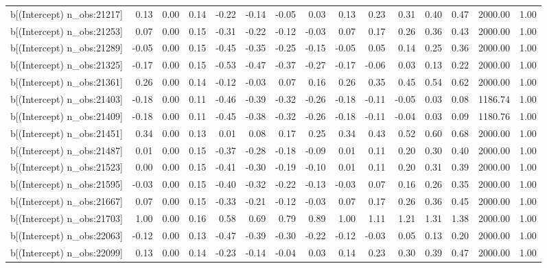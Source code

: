 \begin{table}[ht]
\begin{tabular}{rrrrrrrrrrrrrrr}
  b[(Intercept) n\_obs:21217] & 0.13 & 0.00 & 0.14 & -0.22 & -0.14 & -0.05 & 0.03 & 0.13 & 0.23 & 0.31 & 0.40 & 0.47 & 2000.00 & 1.00 \\ 
  b[(Intercept) n\_obs:21253] & 0.07 & 0.00 & 0.15 & -0.31 & -0.22 & -0.12 & -0.03 & 0.07 & 0.17 & 0.26 & 0.36 & 0.43 & 2000.00 & 1.00 \\ 
  b[(Intercept) n\_obs:21289] & -0.05 & 0.00 & 0.15 & -0.45 & -0.35 & -0.25 & -0.15 & -0.05 & 0.05 & 0.14 & 0.25 & 0.36 & 2000.00 & 1.00 \\ 
  b[(Intercept) n\_obs:21325] & -0.17 & 0.00 & 0.15 & -0.53 & -0.47 & -0.37 & -0.27 & -0.17 & -0.06 & 0.03 & 0.13 & 0.22 & 2000.00 & 1.00 \\ 
  b[(Intercept) n\_obs:21361] & 0.26 & 0.00 & 0.14 & -0.12 & -0.03 & 0.07 & 0.16 & 0.26 & 0.35 & 0.45 & 0.54 & 0.62 & 2000.00 & 1.00 \\ 
  b[(Intercept) n\_obs:21403] & -0.18 & 0.00 & 0.11 & -0.46 & -0.39 & -0.32 & -0.26 & -0.18 & -0.11 & -0.05 & 0.03 & 0.08 & 1186.74 & 1.00 \\ 
  b[(Intercept) n\_obs:21409] & -0.18 & 0.00 & 0.11 & -0.45 & -0.38 & -0.32 & -0.26 & -0.18 & -0.11 & -0.04 & 0.03 & 0.09 & 1180.76 & 1.00 \\ 
  b[(Intercept) n\_obs:21451] & 0.34 & 0.00 & 0.13 & 0.01 & 0.08 & 0.17 & 0.25 & 0.34 & 0.43 & 0.52 & 0.60 & 0.68 & 2000.00 & 1.00 \\ 
  b[(Intercept) n\_obs:21487] & 0.01 & 0.00 & 0.15 & -0.37 & -0.28 & -0.18 & -0.09 & 0.01 & 0.11 & 0.20 & 0.30 & 0.40 & 2000.00 & 1.00 \\ 
  b[(Intercept) n\_obs:21523] & 0.00 & 0.00 & 0.15 & -0.41 & -0.30 & -0.19 & -0.10 & 0.01 & 0.11 & 0.20 & 0.31 & 0.39 & 2000.00 & 1.00 \\ 
  b[(Intercept) n\_obs:21595] & -0.03 & 0.00 & 0.15 & -0.40 & -0.32 & -0.22 & -0.13 & -0.03 & 0.07 & 0.16 & 0.26 & 0.35 & 2000.00 & 1.00 \\ 
  b[(Intercept) n\_obs:21667] & 0.07 & 0.00 & 0.15 & -0.33 & -0.21 & -0.12 & -0.03 & 0.07 & 0.17 & 0.26 & 0.36 & 0.45 & 2000.00 & 1.00 \\ 
  b[(Intercept) n\_obs:21703] & 1.00 & 0.00 & 0.16 & 0.58 & 0.69 & 0.79 & 0.89 & 1.00 & 1.11 & 1.21 & 1.31 & 1.38 & 2000.00 & 1.00 \\ 
  b[(Intercept) n\_obs:22063] & -0.12 & 0.00 & 0.13 & -0.47 & -0.39 & -0.30 & -0.22 & -0.12 & -0.03 & 0.05 & 0.13 & 0.20 & 2000.00 & 1.00 \\ 
  b[(Intercept) n\_obs:22099] & 0.13 & 0.00 & 0.14 & -0.23 & -0.14 & -0.04 & 0.03 & 0.14 & 0.23 & 0.30 & 0.39 & 0.47 & 2000.00 & 1.00 \\ 

\end{tabular}
\end{table}
